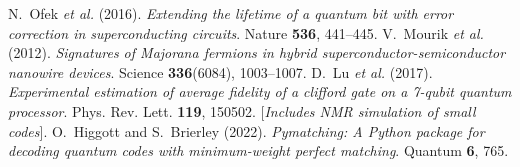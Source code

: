 \documentclass[11pt]{article}
\begin{document}
\begin{thebibliography}{99}
 N.~Ofek \textit{et al.} (2016). \textit{Extending the lifetime of a quantum bit with error correction in superconducting circuits}. Nature \textbf{536}, 441–445.
 V.~Mourik \textit{et al.} (2012). \textit{Signatures of Majorana fermions in hybrid superconductor-semiconductor nanowire devices}. Science \textbf{336}(6084), 1003–1007.
 D.~Lu \textit{et al.} (2017). \textit{Experimental estimation of average fidelity of a clifford gate on a 7-qubit quantum processor}. Phys. Rev. Lett. \textbf{119}, 150502. [\textit{Includes NMR simulation of small codes}].
 O.~Higgott and S.~Brierley (2022). \textit{Pymatching: A Python package for decoding quantum codes with minimum-weight perfect matching}. Quantum \textbf{6}, 765.
\end{thebibliography}
\end{document}
